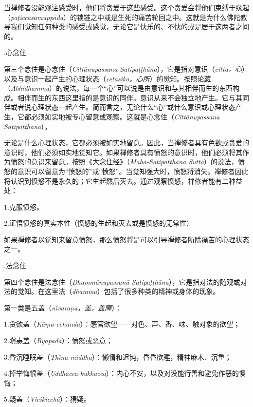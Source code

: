 当禅修者没能观注感受时，他们将贪爱于这些感受。这个贪爱会将他们束缚于缘起（{\it pa\d ticcasamupp\=ada}）的锁链之中或是生死的痛苦轮回之中。这就是为什么佛陀教导我们觉知任何种类的感受或感觉，无论它是快乐的、不快的或是居于这两者之间的。

.\1心念住

第三个念住是心念住（{\it Citt\=anupassana Satipa\d t\d th\=ana}），它是指对意识（{\it citta，心}）以及与意识一起产生的心理状态（{\it cetasika，心所}）的觉知。按照论藏（{\it Abhidhamma}）的说法，每一个“心”可以说是由意识和与其相伴而生的东西构成。相伴而生的东西这里指的是意识的同伴。意识从来不会独立地产生。它与其同伴或者说心理状态一起产生。简而言之，无论什么“心”或什么意识或心理状态产生，它都必须如实地被专心留意或观察。这就是心念住（{\it Citt\=anupassana Satipa\d t\d th\=ana}）。

无论是什么心理状态，它都必须被如实地留意。因此，当禅修者具有色欲或贪爱的意识时，他们必须如实地觉知它。如果禅修者具有愤怒的意识时，他们必须将其作为愤怒的意识来留意。按照《大念住经》（{\it Mah\=a-Satipa\d t\d th\=ana Sutta}）的说法，愤怒的意识可以留意为“愤怒的”或“愤怒”。当觉知强大时，愤怒将消失。禅修者因此将认识到愤怒不是永久的；它生起然后灭去。通过观察愤怒，禅修者能有二种益处：

{
\leftskip=1.6pc
\item{1.}克服愤怒。
\item{2.}证悟愤怒的真实本性（愤怒的生起和灭去或是愤怒的无常性）

}

如果禅修者以觉知来留意愤怒，那么愤怒将是可以引导禅修者断除痛苦的心理状态之一。

.\1法念住

第四个念住是法念住（{\it Dhamm\=anupassan\=a Satipa\d t\d th\=ana}），它是指对法的随观或对法的觉知。在这里法（{\it dhamma}）包括了很多种类的精神或身体的现象。

第一类是五盖（{\it n\=\i vara\d na，盖，盖障}）：

{
\leftskip=1.6pc
\item{1.}贪欲盖（{\it K\=a\d ma-cchanda}）：感官欲望——对色、声、香、味、触对象的欲望；
\item{2.}瞋恚盖（{\it By\=ap\=ada}）：愤怒或恶意；
\item{3.}昏沉睡眠盖（{\it Th\=\i na-middha}）：懒惰和迟钝，昏昏欲睡，精神麻木、沉重；
\item{4.}掉举悔恨盖（{\it Uddhacca-kukkucca}）：内心不安，以及对没能行善和避免作恶的懊悔；
\item{5.}疑盖（{\it Vicikicch\=a}）：猜疑。

}

